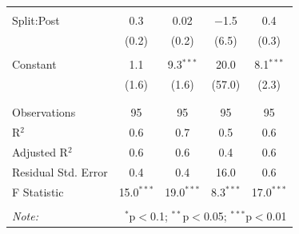 \documentclass[12pt, a4paper]{article}
\begin{document}
\begin{table}[!htbp]
{\begin{tabular}{@{\extracolsep{5pt}}lcccc}
			& & & & \\ 
			Split:Post & 0.3 & 0.02 & $-$1.5 & 0.4 \\ 
			& (0.2) & (0.2) & (6.5) & (0.3) \\ 
			& & & & \\ 
			Constant & 1.1 & 9.3$^{***}$ & 20.0 & 8.1$^{***}$ \\ 
			& (1.6) & (1.6) & (57.0) & (2.3) \\ 
			& & & & \\ 
			\hline \\[-1.8ex] 
			Observations & 95 & 95 & 95 & 95 \\ 
			R$^{2}$ & 0.6 & 0.7 & 0.5 & 0.6 \\ 
			Adjusted R$^{2}$ & 0.6 & 0.6 & 0.4 & 0.6 \\ 
			Residual Std. Error & 0.4 & 0.4 & 16.0 & 0.6 \\ 
			F Statistic & 15.0$^{***}$ & 19.0$^{***}$ & 8.3$^{***}$ & 17.0$^{***}$ \\ 
			\hline 
			\hline \\[-1.8ex] 
			\textit{Note:}  & \multicolumn{4}{r}{$^{*}$p$<$0.1; $^{**}$p$<$0.05; $^{***}$p$<$0.01} \\ 
		\end{tabular} }
	\end{table} %
\end{document}
